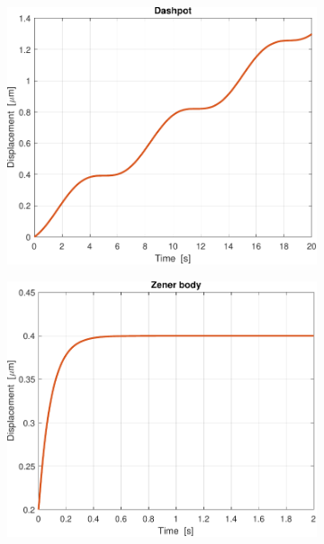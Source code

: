 \begin{figure}[t!]
\begin{subfigure}{0.33\linewidth}
	\includegraphics[width=0.95\linewidth]{../code/figs/harmonic_dashpot_}
	\caption{}
\end{subfigure}\hfill
	\begin{subfigure}{0.33\linewidth}
		\centering
			\includegraphics[width=0.95\linewidth]{../code/figs/step_zener_}
		\caption{}
	\end{subfigure}\hfill
	\begin{subfigure}{0.33\linewidth}
		\centering

\end{subfigure}
\end{figure}
